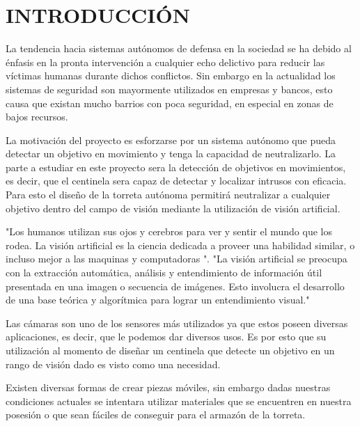 \newpage
{} 

%
%

\section*{INTRODUCCIÓN}

La tendencia hacia sistemas autónomos de defensa en la sociedad se ha debido al énfasis en la pronta intervención a cualquier echo delictivo para reducir las víctimas humanas durante dichos conflictos. Sin embargo en la actualidad los sistemas de seguridad son mayormente utilizados en empresas y bancos, esto causa que existan mucho barrios con poca seguridad, en especial en zonas de bajos recursos. 

La motivación del proyecto es esforzarse por un sistema autónomo que pueda detectar un objetivo en movimiento y tenga la capacidad de neutralizarlo. La parte a estudiar en este proyecto sera la detección de objetivos en movimientos, es decir, que el centinela sera capaz de detectar y localizar intrusos con eficacia. Para esto el diseño de la torreta autónoma permitirá neutralizar a cualquier objetivo dentro del campo de visión mediante la utilización de visión artificial.

"Los humanos utilizan sus ojos y cerebros para ver y sentir el mundo que los rodea. La visión artificial es la ciencia dedicada a proveer una habilidad similar, o incluso mejor a las maquinas y computadoras ".\cite{barrero2015algoritmo}
"La visión artificial se preocupa con la extracción automática, análisis y entendimiento de información útil presentada en una imagen o secuencia de imágenes. Esto involucra el desarrollo de una base teórica y algorítmica para lograr un entendimiento visual."\cite{BMVA:Online}

Las cámaras son uno de los sensores más utilizados ya que estos poseen diversas aplicaciones, es decir, que le podemos dar diversos usos\cite{sankaranarayanan2008object}. Es por esto que su utilización al momento de diseñar un centinela que detecte un objetivo en un rango de visión dado es visto como una necesidad. 

Existen diversas formas de crear piezas móviles, sin embargo dadas nuestras condiciones actuales se intentara utilizar materiales que se encuentren en nuestra posesión o que sean fáciles de conseguir para el armazón de la torreta.

